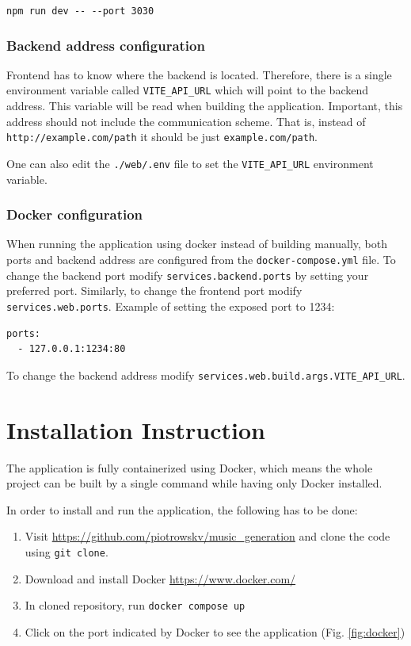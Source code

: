 \documentclass{article}
\begin{document}
\verb|npm run dev -- --port 3030|


\subsubsection{Backend address configuration}

Frontend has to know where the backend is located. Therefore, there is a single environment variable called \verb|VITE_API_URL| which will point to the backend address. This variable will be read when building the application. Important, this address should not include the communication scheme. That is, instead of \verb|http://example.com/path| it should be just \verb|example.com/path|.

One can also edit the \verb|./web/.env| file to set the \verb|VITE_API_URL| environment variable.


\subsubsection{Docker configuration}

When running the application using docker instead of building manually, both ports and backend address are configured from the \verb|docker-compose.yml| file. To change the backend port modify \verb|services.backend.ports| by setting your preferred port. Similarly, to change the frontend port modify \verb|services.web.ports|. Example of setting the exposed port to 1234:

\begin{lstlisting}
ports:
  - 127.0.0.1:1234:80
\end{lstlisting}

To change the backend address modify \verb|services.web.build.args.VITE_API_URL|.


\section{Installation Instruction} \label{installation}

The application is fully containerized using Docker, which means the whole project can be built by a single command while having only Docker installed.

In order to install and run the application, the following has to be done:

\begin{enumerate}
    \item Visit \href{https://github.com/piotrowskv/music_generation}{https://github.com/piotrowskv/music\_generation} and clone the code using \verb|git clone|.
    \item Download and install Docker \href{https://www.docker.com/}{https://www.docker.com/}
    \item In cloned repository, run \verb|docker compose up|
    \item Click on the port indicated by Docker to see the application (Fig. \ref{fig:docker})
\end{enumerate}
\end{document}
